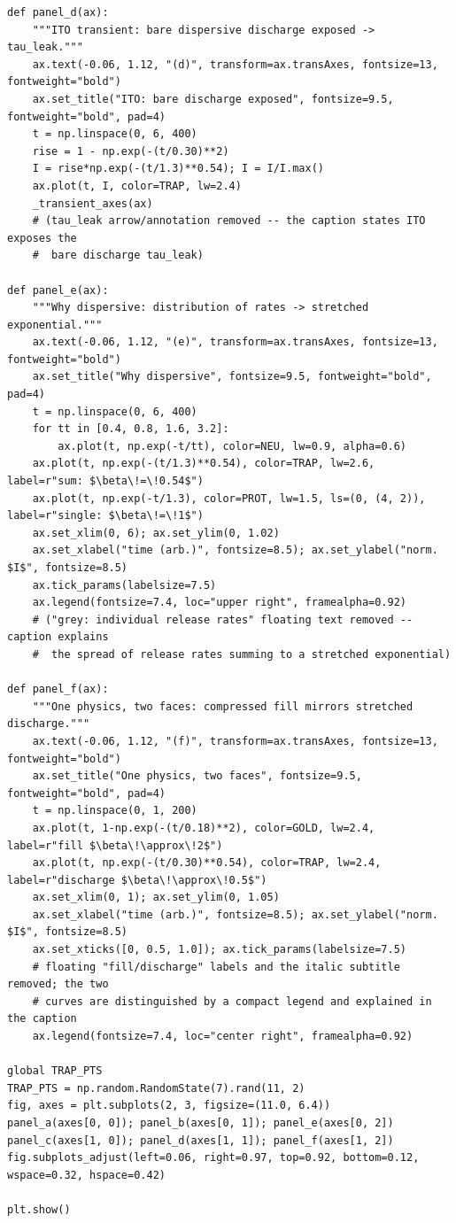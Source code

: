 \begin{lstlisting}[caption={schematics.ipynb code cell 2},label={lst:mrl-nb-schematics-2}]
def panel_d(ax):
    """ITO transient: bare dispersive discharge exposed -> tau_leak."""
    ax.text(-0.06, 1.12, "(d)", transform=ax.transAxes, fontsize=13, fontweight="bold")
    ax.set_title("ITO: bare discharge exposed", fontsize=9.5, fontweight="bold", pad=4)
    t = np.linspace(0, 6, 400)
    rise = 1 - np.exp(-(t/0.30)**2)
    I = rise*np.exp(-(t/1.3)**0.54); I = I/I.max()
    ax.plot(t, I, color=TRAP, lw=2.4)
    _transient_axes(ax)
    # (tau_leak arrow/annotation removed -- the caption states ITO exposes the
    #  bare discharge tau_leak)

def panel_e(ax):
    """Why dispersive: distribution of rates -> stretched exponential."""
    ax.text(-0.06, 1.12, "(e)", transform=ax.transAxes, fontsize=13, fontweight="bold")
    ax.set_title("Why dispersive", fontsize=9.5, fontweight="bold", pad=4)
    t = np.linspace(0, 6, 400)
    for tt in [0.4, 0.8, 1.6, 3.2]:
        ax.plot(t, np.exp(-t/tt), color=NEU, lw=0.9, alpha=0.6)
    ax.plot(t, np.exp(-(t/1.3)**0.54), color=TRAP, lw=2.6, label=r"sum: $\beta\!=\!0.54$")
    ax.plot(t, np.exp(-t/1.3), color=PROT, lw=1.5, ls=(0, (4, 2)), label=r"single: $\beta\!=\!1$")
    ax.set_xlim(0, 6); ax.set_ylim(0, 1.02)
    ax.set_xlabel("time (arb.)", fontsize=8.5); ax.set_ylabel("norm. $I$", fontsize=8.5)
    ax.tick_params(labelsize=7.5)
    ax.legend(fontsize=7.4, loc="upper right", framealpha=0.92)
    # ("grey: individual release rates" floating text removed -- caption explains
    #  the spread of release rates summing to a stretched exponential)

def panel_f(ax):
    """One physics, two faces: compressed fill mirrors stretched discharge."""
    ax.text(-0.06, 1.12, "(f)", transform=ax.transAxes, fontsize=13, fontweight="bold")
    ax.set_title("One physics, two faces", fontsize=9.5, fontweight="bold", pad=4)
    t = np.linspace(0, 1, 200)
    ax.plot(t, 1-np.exp(-(t/0.18)**2), color=GOLD, lw=2.4, label=r"fill $\beta\!\approx\!2$")
    ax.plot(t, np.exp(-(t/0.30)**0.54), color=TRAP, lw=2.4, label=r"discharge $\beta\!\approx\!0.5$")
    ax.set_xlim(0, 1); ax.set_ylim(0, 1.05)
    ax.set_xlabel("time (arb.)", fontsize=8.5); ax.set_ylabel("norm. $I$", fontsize=8.5)
    ax.set_xticks([0, 0.5, 1.0]); ax.tick_params(labelsize=7.5)
    # floating "fill/discharge" labels and the italic subtitle removed; the two
    # curves are distinguished by a compact legend and explained in the caption
    ax.legend(fontsize=7.4, loc="center right", framealpha=0.92)

global TRAP_PTS
TRAP_PTS = np.random.RandomState(7).rand(11, 2)
fig, axes = plt.subplots(2, 3, figsize=(11.0, 6.4))
panel_a(axes[0, 0]); panel_b(axes[0, 1]); panel_e(axes[0, 2])
panel_c(axes[1, 0]); panel_d(axes[1, 1]); panel_f(axes[1, 2])
fig.subplots_adjust(left=0.06, right=0.97, top=0.92, bottom=0.12, wspace=0.32, hspace=0.42)

plt.show()
\end{lstlisting}

